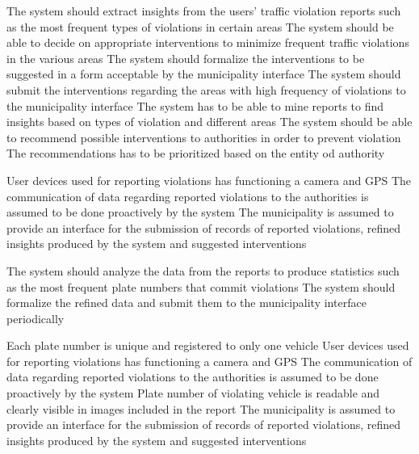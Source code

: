 \textbf{}

\begin{itemize}

\require The system should extract insights from the users’ traffic violation reports such as the most frequent types of violations in certain areas
\require The system should be able to decide on appropriate interventions to minimize frequent traffic violations in the various areas
\require The system should formalize the interventions to be suggested in a form acceptable by the municipality interface
\require The system should submit the interventions regarding the areas with high frequency of violations to the municipality interface
\require The system has to be able to mine reports to find insights based on types of violation and different areas
\require The system should be able to recommend possible interventions to authorities in order to prevent violation
\require The recommendations has to be prioritized based on the entity od authority
\end{itemize}

\begin{itemize}

\domain User devices used for reporting violations has functioning a camera and GPS
\domain The communication of data regarding reported violations to the authorities is assumed to be done proactively by the system
\domain The municipality is assumed to provide an interface for the submission of records of reported violations, refined insights produced by the system and suggested interventions

\end{itemize}

\textbf{}

\begin{itemize}

\require The system should analyze the data from the reports to produce statistics such as the most frequent plate numbers that commit violations
\require The system should formalize the refined data and submit them to the municipality interface periodically

\end{itemize}

\begin{itemize}

\domain Each plate number is unique and registered to only one vehicle
\domain User devices used for reporting violations has functioning a camera and GPS
\domain The communication of data regarding reported violations to the authorities is assumed to be done proactively by the system
\domain Plate number of violating vehicle is readable and clearly visible in images included in the report
\domain The municipality is assumed to provide an interface for the submission of records of reported violations, refined insights produced by the system and suggested interventions
\end{itemize}

